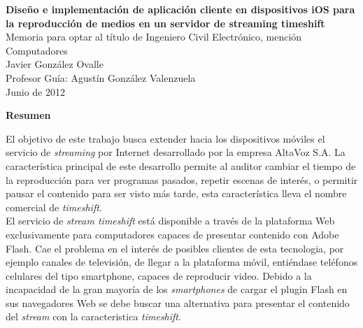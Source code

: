 \newpage
\thispagestyle{empty}
\begin{center}
 \Large \textbf{Diseño e implementación de aplicación cliente en dispositivos iOS para la reproducción de medios en un servidor de streaming timeshift}\\

\normalsize Memoria para optar al título de Ingeniero Civil Electrónico, mención Computadores \\
\normalsize Javier González Ovalle \\
\normalsize Profesor Guía: Agustín González Valenzuela \\
\normalsize Junio de 2012

\Large \textbf{Resumen}

\end{center}
\normalsize


El objetivo de este trabajo busca extender hacia los dispositivos móviles el servicio de \textit{streaming} por Internet desarrollado por la empresa AltaVoz S.A. La característica principal de este desarrollo permite al auditor cambiar el tiempo de la reproducción para ver programas pasados, repetir escenas de interés, o permitir pausar el contenido para ser visto más tarde, esta característica lleva el nombre comercial de \textit{timeshift}.\\


El servicio de \textit{stream timeshift} está disponible a través de la plataforma Web exclusivamente para computadores capaces de presentar contenido con Adobe Flash. Cae el problema en el interés de posibles clientes de esta tecnologia, por ejemplo canales de televisión, de llegar a la plataforma móvil, entiéndase teléfonos celulares del tipo smartphone, capaces de reproducir video. Debido a la incapacidad de la gran mayoría de los \textit{smartphones} de cargar el plugin Flash en sus navegadores Web se debe buscar una alternativa para presentar el contenido del \textit{stream} con la caracteristica \textit{timeshift}.
\\

